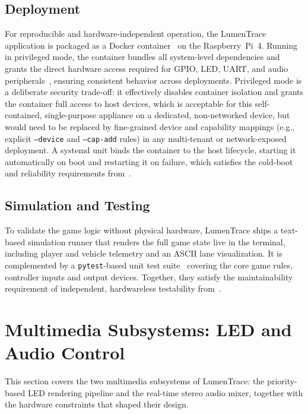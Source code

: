 \documentclass[10pt,journal,final,a4paper]{IEEEtran}
\begin{document}
\subsection{Deployment}
\label{subsec:deployment}

For reproducible and hardware-independent operation, the LumenTrace application is packaged as a Docker container~\cite{merkel:2014docker} on the Raspberry~Pi~4. Running in privileged mode, the container bundles all system-level dependencies and grants the direct hardware access required for GPIO, LED, UART, and audio peripherals~\cite{croston:2022raspberry}, ensuring consistent behavior across deployments. Privileged mode is a deliberate security trade-off: it effectively disables container isolation and grants the container full access to host devices, which is acceptable for this self-contained, single-purpose appliance on a dedicated, non-networked device, but would need to be replaced by fine-grained device and capability mappings (e.g., explicit \texttt{--device} and \texttt{--cap-add} rules) in any multi-tenant or network-exposed deployment. A systemd unit binds the container to the host lifecycle, starting it automatically on boot and restarting it on failure, which satisfies the cold-boot and reliability requirements from~.

\subsection{Simulation and Testing}
\label{subsec:simulation-and-testing}

To validate the game logic without physical hardware, LumenTrace ships a text-based simulation runner that renders the full game state live in the terminal, including player and vehicle telemetry and an ASCII lane visualization. It is complemented by a \texttt{pytest}-based unit test suite~\cite{krekel:2026pytest} covering the core game rules, controller inputs and output devices. Together, they satisfy the maintainability requirement of independent, hardwareless testability from~.


\section{Multimedia Subsystems: LED and Audio Control}
\label{sec:multimedia-subsystems}

This section covers the two multimedia subsystems of LumenTrace: the priority-based LED rendering pipeline and the real-time stereo audio mixer, together with the hardware constraints that shaped their design.
\end{document}
